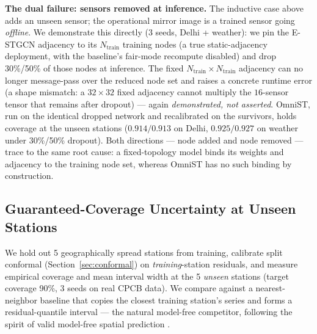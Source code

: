 \documentclass[journal]{IEEEtran}
\begin{document}
\textbf{The dual failure: sensors removed at inference.} The inductive case above adds an unseen
sensor; the operational mirror image is a trained sensor going \emph{offline}. We demonstrate this
directly (3 seeds, Delhi + weather): we pin the E-STGCN adjacency to its $N_{\text{train}}$ training
nodes (a true static-adjacency deployment, with the baseline's fair-mode recompute disabled) and drop
30\%/50\% of those nodes at inference. The fixed $N_{\text{train}}{\times}N_{\text{train}}$ adjacency
can no longer message-pass over the reduced node set and raises a concrete runtime error (a shape
mismatch: a $32{\times}32$ fixed adjacency cannot multiply the $16$-sensor tensor that remains after
dropout) --- again \emph{demonstrated, not asserted}. OmniST, run on the identical dropped network and recalibrated on
the survivors, holds coverage at the unseen stations ($0.914/0.913$ on Delhi, $0.925/0.927$ on
weather under 30\%/50\% dropout). Both directions --- node added and node removed --- trace to the
same root cause: a fixed-topology model binds its weights and adjacency to the training node set,
whereas OmniST has no such binding by construction.

\subsection{Guaranteed-Coverage Uncertainty at Unseen Stations}
\label{sec:conformal-results}

We hold out 5 geographically spread stations from training, calibrate split conformal
(Section~\ref{sec:conformal}) on \emph{training}-station residuals, and measure empirical coverage
and mean interval width at the 5 \emph{unseen} stations (target coverage 90\%, 3 seeds on real CPCB
data). We compare against a nearest-neighbor baseline that copies the closest training station's
series and forms a residual-quantile interval --- the natural model-free competitor, following the
spirit of valid model-free spatial prediction \cite{validspatial2020}.
\end{document}
